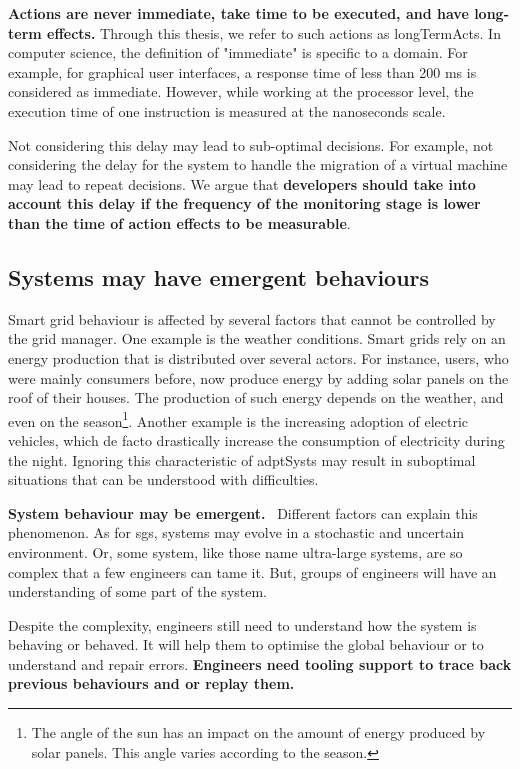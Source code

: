 \textbf{Actions are never immediate, take time to be executed, and have long-term effects.}
Through this thesis, we refer to such actions as \glspl{longTermAct}.
In computer science, the definition of "immediate" is specific to a domain.
For example, for graphical user interfaces, a response time of less than 200 ms is considered as immediate.
However, while working at the processor level, the execution time of one instruction is measured at the nanoseconds scale.

Not considering this delay may lead to sub-optimal decisions.
For example, not considering the delay for the system to handle the migration of a virtual machine may lead to repeat decisions.
We argue that \textbf{developers should take into account this delay if the frequency of the monitoring stage is lower than the time of action effects to be measurable}.

\subsection{Systems may have emergent behaviours}
Smart grid behaviour is affected by several factors that cannot be controlled by the grid manager.
One example is the weather conditions.
Smart grids rely on an energy production that is distributed over several actors.
For instance, users, who were mainly consumers before, now produce energy by adding solar panels on the roof of their houses.
The production of such energy depends on the weather, and even on the season\footnote{The angle of the sun has an impact on the amount of energy produced by solar panels. This angle varies according to the season.}.
Another example is the increasing adoption of electric vehicles, which de facto drastically increase the consumption of electricity during the night.
Ignoring this characteristic of \glspl{adptSyst} may result in suboptimal situations that can be understood with difficulties.

\textbf{System behaviour may be emergent.}~\cite{zio2011uncertainties}
Different factors can explain this phenomenon.
As for \glspl{sg}, systems may evolve in a stochastic and uncertain environment.
Or, some system, like those name ultra-large systems, are so complex that a few engineers can tame it.
But, groups of engineers will have an understanding of some part of the system.

Despite the complexity, engineers still need to understand how the system is behaving or behaved.
It will help them to optimise the global behaviour or to understand and repair errors.
\textbf{Engineers need tooling support to trace back previous behaviours and or replay them.}


